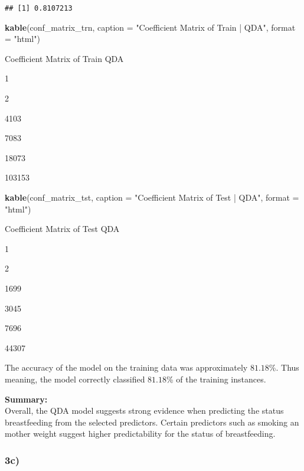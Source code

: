 \documentclass[
]{article}
\newenvironment{Shaded}{\begin{snugshade}}{\end{snugshade}}
\newcommand{\AttributeTok}[1]{\textcolor[rgb]{0.13,0.29,0.53}{#1}}
\newcommand{\FunctionTok}[1]{\textcolor[rgb]{0.13,0.29,0.53}{\textbf{#1}}}
\newcommand{\NormalTok}[1]{#1}
\newcommand{\StringTok}[1]{\textcolor[rgb]{0.31,0.60,0.02}{#1}}
\begin{document}
\begin{verbatim}
## [1] 0.8107213
\end{verbatim}

\begin{Shaded}
\begin{Highlighting}[]
\FunctionTok{kable}\NormalTok{(conf\_matrix\_trn, }\AttributeTok{caption =} \StringTok{"Coefficient Matrix of Train | QDA"}\NormalTok{, }\AttributeTok{format =} \StringTok{"html"}\NormalTok{)}
\end{Highlighting}
\end{Shaded}

Coefficient Matrix of Train \textbar{} QDA

1

2

4103

7083

18073

103153

\begin{Shaded}
\begin{Highlighting}[]
\FunctionTok{kable}\NormalTok{(conf\_matrix\_tst, }\AttributeTok{caption =} \StringTok{"Coefficient Matrix of Test  | QDA"}\NormalTok{, }\AttributeTok{format =} \StringTok{"html"}\NormalTok{)}
\end{Highlighting}
\end{Shaded}

Coefficient Matrix of Test \textbar{} QDA

1

2

1699

3045

7696

44307

The accuracy of the model on the training data was approximately
\(81.18\)\%. Thus meaning, the model correctly classified \(81.18\)\% of
the training instances.

\textbf{Summary:}\\
Overall, the QDA model suggests strong evidence when predicting the
status breastfeeding from the selected predictors. Certain predictors
such as smoking an mother weight suggest higher predictability for the
status of breastfeeding.

\newpage

\subsubsection{3c)}\label{c}
\end{document}
